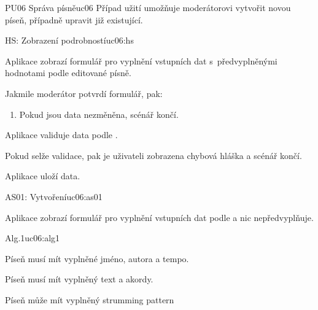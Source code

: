 \begin{usecase}{PU06 Správa písně}{uc06}
    Případ užití umožňuje moderátorovi vytvořit novou píseň, případně upravit již existující.

    \begin{scenario}{HS: Zobrazení podrobností}{uc06:hs}
        \item Aplikace zobrazí formulář pro vyplnění vstupních dat s~předvyplněnými hodnotami podle editované písně.
        \item Jakmile moderátor potvrdí formulář, pak:
        \begin{enumerate}
            \item Pokud jsou data nezměněna, scénář končí.
        \end{enumerate}
        \item Aplikace validuje data podle .
        \item Pokud selže validace, pak je uživateli zobrazena chybová hláška a scénář končí.
        \item Aplikace uloží data.
    \end{scenario}

    \begin{scenario}{AS01: Vytvoření}{uc06:as01}
        \item Aplikace zobrazí formulář pro vyplnění vstupních dat podle  a nic nepředvyplňuje.
    \end{scenario}

    \begin{scenario}{Alg.1}{uc06:alg1}
        \item Píseň musí mít vyplněné jméno, autora a tempo.
        \item Píseň musí mít vyplněný text a akordy.
        \item Píseň může mít vyplněný strumming pattern
    \end{scenario}
\end{usecase}
